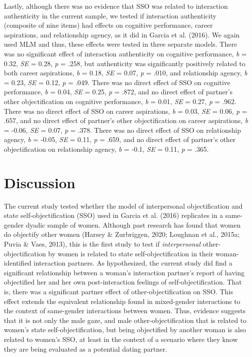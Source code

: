 \documentclass[man]{apa6}
\begin{document}
Lastly, although there was no evidence that SSO was related to
interaction authenticity in the current sample, we tested if interaction
authenticity (composite of nine items) had effects on cognitive
performance, career aspirations, and relationship agency, as it did in
Garcia et al. (2016). We again used MLM and thus, these effects were
tested in three separate models. There was no significant effect of
interaction authenticity on cognitive performance, \emph{b} = 0.32,
\emph{SE} = 0.28, \emph{p} = .258, but authenticity was significantly
positively related to both career aspirations, \emph{b} = 0.18,
\emph{SE} = 0.07, \emph{p} = .010, and relationship agency, \emph{b} =
0.23, \emph{SE} = 0.12, \emph{p} = .049. There was no direct effect of
SSO on cognitive performance, \emph{b} = 0.04, \emph{SE} = 0.25,
\emph{p} = .872, and no direct effect of partner's other objectification
on cognitive performance, \emph{b} = 0.01, \emph{SE} = 0.27, \emph{p} =
.962. There was no direct effect of SSO on career aspirations, \emph{b}
= 0.03, \emph{SE} = 0.06, \emph{p} = .657, and no direct effect of
partner's other objectification on career aspirations, \emph{b} = -0.06,
\emph{SE} = 0.07, \emph{p} = .378. There was no direct effect of SSO on
relationship agency, \emph{b} = -0.05, \emph{SE} = 0.11, \emph{p} =
.659, and no direct effect of partner's other objectification on
relationship agency, \emph{b} = -0.1, \emph{SE} = 0.11, \emph{p} = .365.

\section{Discussion}\label{discussion}

The current study tested whether the model of interpersonal
objectification and state self-objectification (SSO) used in Garcia et
al. (2016) replicates in a same-gender dyadic sample of women. Although
past research has found that women do objectify other women (Harsey \&
Zurbriggen, 2020; Loughnan et al., 2015a; Puvia \& Vaes, 2013), this is
the first study to test if \emph{interpersonal} other-objectification by
women is related to state self-objectification in their woman-identified
interaction partners. As hypothesized, the current study did find a
significant relationship between a woman's interaction partner's report
of having objectified her and her own post-interaction feelings of
self-objectification. That is, there was a significant partner effect of
other-objectification on SSO. This effect extends the equivalent
relationship found in mixed-gender interactions to the context of
same-gender interactions between women. Thus, evidence suggests that it
is not only the male gaze, and male other-objectification that is
related to women's state self-objectification, but being objectified by
another woman is also related to women's SSO, at least in the context of
a scenario where they know they are being evaluated as a potential
dating partner.
\end{document}
